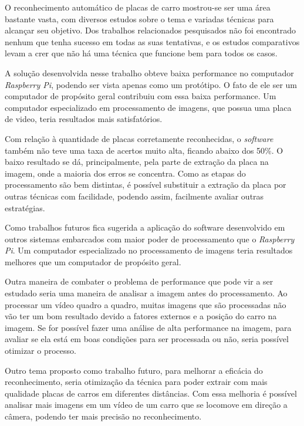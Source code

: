 O reconhecimento automático de placas de carro mostrou-se ser uma área bastante
vasta, com diversos estudos sobre o tema e variadas técnicas para alcançar seu
objetivo. Dos trabalhos relacionados pesquisados não foi encontrado nenhum que
tenha sucesso em todas as suas tentativas, e os estudos comparativos levam a
crer que não há uma técnica que funcione bem para todos os casos. 

A solução desenvolvida nesse trabalho obteve baixa performance no computador
\emph{Raspberry Pi}, podendo ser vista apenas como um protótipo. O fato de ele
ser um computador de propósito geral contribuiu com essa baixa performance. Um
computador especializado em processamento de imagens, que possua uma placa de
video, teria resultados mais satisfatórios.

Com relação à quantidade de placas corretamente reconhecidas, o \emph{software}
também não teve uma taxa de acertos muito alta, ficando abaixo dos 50\%. O baixo
resultado se dá, principalmente, pela parte de extração da placa na imagem, onde
a maioria dos erros se concentra. Como as etapas do processamento são bem
distintas, é possível substituir a extração da placa por outras técnicas com
facilidade, podendo assim, facilmente avaliar outras estratégias.

Como trabalhos futuros fica sugerida a aplicação do software desenvolvido em
outros sistemas embarcados com maior poder de processamento que o
\emph{Raspberry Pi}. Um computador especializado no processamento de imagens
teria resultados melhores que um computador de propósito geral.

Outra maneira de combater o problema de performance que pode vir a ser estudado
seria uma maneira de analisar a imagem antes do processamento. Ao processar um
vídeo quadro a quadro, muitas imagens que são processadas não vão ter um bom
resultado devido a fatores externos e a posição do carro na imagem. Se for
possível fazer uma análise de alta performance na imagem, para avaliar se ela
está em boas condições para ser processada ou não, seria possível otimizar o
processo. 

Outro tema proposto como trabalho futuro, para melhorar a eficácia do
reconhecimento, seria otimização da técnica para poder extrair com mais
qualidade placas de carros em diferentes distâncias. Com essa melhoria é
possível analisar mais imagens em um vídeo de um carro que se locomove em
direção a câmera, podendo ter mais precisão no reconhecimento.
